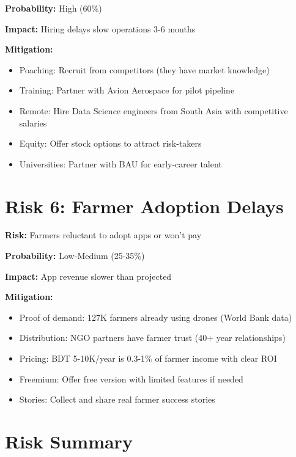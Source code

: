 \textbf{Probability:} High (60\%)

\textbf{Impact:} Hiring delays slow operations 3-6 months

\textbf{Mitigation:}
\begin{itemize}
    \item Poaching: Recruit from competitors (they have market knowledge)
    \item Training: Partner with Avion Aerospace for pilot pipeline
    \item Remote: Hire Data Science engineers from South Asia with competitive salaries
    \item Equity: Offer stock options to attract risk-takers
    \item Universities: Partner with BAU for early-career talent
\end{itemize}

\section{Risk 6: Farmer Adoption Delays}

\textbf{Risk:} Farmers reluctant to adopt apps or won't pay

\textbf{Probability:} Low-Medium (25-35\%)

\textbf{Impact:} App revenue slower than projected

\textbf{Mitigation:}
\begin{itemize}
    \item Proof of demand: 127K farmers already using drones (World Bank data)
    \item Distribution: NGO partners have farmer trust (40+ year relationships)
    \item Pricing: BDT 5-10K/year is 0.3-1\% of farmer income with clear ROI
    \item Freemium: Offer free version with limited features if needed
    \item Stories: Collect and share real farmer success stories
\end{itemize}

\section{Risk Summary}

